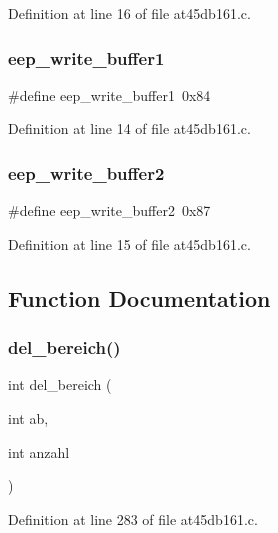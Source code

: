 Definition at line 16 of file at45db161.\+c.

\mbox{\label{at45db161_8c_adf5de6ec9522578a655b6e0577b86fb5}} 
\subsubsection{eep\+\_\+write\+\_\+buffer1}
{\footnotesize\ttfamily \#define eep\+\_\+write\+\_\+buffer1~0x84}



Definition at line 14 of file at45db161.\+c.

\mbox{\label{at45db161_8c_ab7301a2aeca39851c9acfb4f4e821d5c}} 
\subsubsection{eep\+\_\+write\+\_\+buffer2}
{\footnotesize\ttfamily \#define eep\+\_\+write\+\_\+buffer2~0x87}



Definition at line 15 of file at45db161.\+c.



\subsection{Function Documentation}
\mbox{\label{at45db161_8c_addb71e38f4824f0f7b777d1f1460a24f}} 
\subsubsection{del\+\_\+bereich()}
{\footnotesize\ttfamily int del\+\_\+bereich (\begin{DoxyParamCaption}\item[{int}]{ab,  }\item[{int}]{anzahl }\end{DoxyParamCaption})}



Definition at line 283 of file at45db161.\+c.

\mbox{\label{at45db161_8c_a6448ad9fbbeb06c122e53581da8ab5ea}} 
